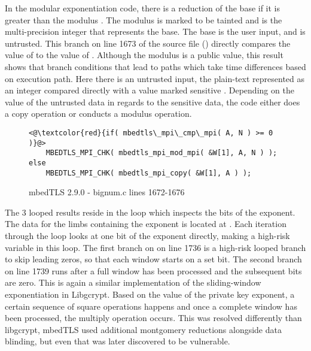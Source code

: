 In the modular exponentiation code, there is a reduction of the base 
if it is greater than the modulus . The modulus  is marked to be tainted
and  is the multi-precision integer that represents the base. The base is the
user input, and is untrusted. This branch on line 1673 of the source file ()
directly compares the value of  to the value of . Although
the modulus is a public value, this result shows that branch conditions that
lead to paths which take time differences based on execution path. Here there is
an untrusted input, the plain-text represented as an integer 
compared directly with a value marked sensitive . Depending on the
value of the untrusted data in regards to the sensitive data, the code either
does a copy operation or conducts a modulus operation.

\begin{figure}[h!]
\begin{lstlisting}
<@\textcolor{red}{if( mbedtls\_mpi\_cmp\_mpi( A, N ) >= 0 )}@>
    MBEDTLS_MPI_CHK( mbedtls_mpi_mod_mpi( &W[1], A, N ) );
else
    MBEDTLS_MPI_CHK( mbedtls_mpi_copy( &W[1], A ) );
\end{lstlisting}

\caption{mbedTLS 2.9.0 - bignum.c lines 1672-1676}
\end{figure}

The 3 looped results reside in the loop which inspects the bits of the exponent.
The data for the limbs containing the exponent is located at . Each
iteration through the loop looks at one bit of the exponent directly, making
 a high-risk variable in this loop. The first branch on  on line 1736 is
a high-risk looped branch to skip leading zeros, so that each window starts on a
set bit. The second branch on line 1739 runs after a full window has been
processed and the subsequent bits are zero. This is again a similar
implementation of the sliding-window exponentiation in Libgcrypt. Based on the
value of the private key exponent, a certain sequence of square operations
happens and once a complete window has been processed, the multiply operation
occurs. This was resolved differently than libgcrypt, mbedTLS used additional
montgomery reductions alongside data blinding\cite{schindler2000timing}, but even that was later
discovered to be vulnerable\cite{walter2001distinguishing}.

